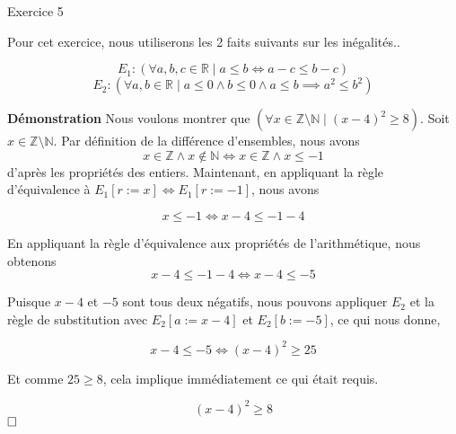 \documentclass{article}
\begin{document}
Exercice 5

\vspace{0.5cm}
Pour cet exercice, nous utiliserons les 2 faits suivants sur les inégalités..

$$E_1:(\forall a,b,c \in \mathbb{R} \mid a \leq b \iff a - c \leq b - c)$$
$$E_2:(\forall a,b\in \mathbb{R}   \mid a \leq 0 \land b \leq 0 \land a \leq b \implies a^2 \leq b^2)$$

\textbf{Démonstration} Nous voulons montrer que $(\forall x \in \mathbb{Z} \setminus \mathbb{N} \mid (x - 4)^2 \geq 8)$. Soit $ x \in \mathbb{Z} \setminus \mathbb{N}.$ Par définition de la différence d'ensembles, nous avons
$$x \in \mathbb{Z} \land x \notin \mathbb{N} \iff x \in \mathbb{Z} \land x \leq -1 $$
d'après les propriétés des entiers. Maintenant, en appliquant la règle d'équivalence à $E_1[r:= x] \iff E_1[r:= -1]$, nous avons

$$ x \leq -1 \iff x - 4 \leq -1 - 4 $$

En appliquant la règle d'équivalence aux propriétés de l'arithmétique, nous obtenons
$$ x - 4 \leq -1 - 4 \iff x - 4 \leq -5 $$

Puisque $x - 4$ et $-5$ sont tous deux négatifs, nous pouvons appliquer $E_2$ et la règle de substitution avec $E_2[a:=x-4]$ et $E_2[b:=-5]$, ce qui nous donne,

$$ x - 4 \leq -5 \iff (x - 4)^2 \geq 25 $$

Et comme $25 \geq 8$, cela implique immédiatement ce qui était requis.

$$ (x - 4)^2 \geq 8 $$
$\hfill \square$
\end{document}
